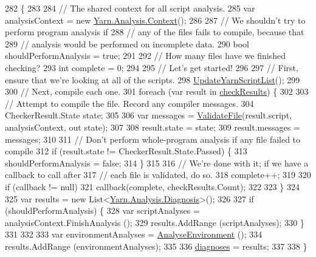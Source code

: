 \begin{DoxyCode}
282         \{
283 
284             \textcolor{comment}{// The shared context for all script analysis.}
285             var analysisContext = \textcolor{keyword}{new} \hyperlink{a00054}{Yarn.Analysis.Context}();
286 
287             \textcolor{comment}{// We shouldn't try to perform program analysis if}
288             \textcolor{comment}{// any of the files fails to compile, because that}
289             \textcolor{comment}{// analysis would be performed on incomplete data.}
290             \textcolor{keywordtype}{bool} shouldPerformAnalysis = \textcolor{keyword}{true};
291 
292             \textcolor{comment}{// How many files have we finished checking?}
293             \textcolor{keywordtype}{int} complete = 0;
294 
295             \textcolor{comment}{// Let's get started!}
296 
297             \textcolor{comment}{// First, ensure that we're looking at all of the scripts.}
298             \hyperlink{a00164_a406febf62d77eaabc235f6316e537345}{UpdateYarnScriptList}();
299 
300             \textcolor{comment}{// Next, compile each one.}
301             \textcolor{keywordflow}{foreach} (var result \textcolor{keywordflow}{in} \hyperlink{a00164_aa85ab7bd194e5425b991b9c216d4d10e}{checkResults}) \{
302 
303                 \textcolor{comment}{// Attempt to compile the file. Record any compiler messages.}
304                 CheckerResult.State state;
305 
306                 var messages = \hyperlink{a00164_a6f2bf42b228ea29c6477e369226db8b6}{ValidateFile}(result.script, analysisContext, out state);
307 
308                 result.state = state;
309                 result.messages = messages;
310 
311                 \textcolor{comment}{// Don't perform whole-program analysis if any file failed to compile}
312                 \textcolor{keywordflow}{if} (result.state != CheckerResult.State.Passed) \{
313                     shouldPerformAnalysis = \textcolor{keyword}{false};
314                 \}
315 
316                 \textcolor{comment}{// We're done with it; if we have a callback to call after}
317                 \textcolor{comment}{// each file is validated, do so.}
318                 complete++;
319 
320                 \textcolor{keywordflow}{if} (callback != null)
321                     callback(complete, checkResults.Count);
322 
323             \}
324 
325             var results = \textcolor{keyword}{new} List<\hyperlink{a00087}{Yarn.Analysis.Diagnosis}>();
326 
327             \textcolor{keywordflow}{if} (shouldPerformAnalysis) \{
328                 var scriptAnalyses = analysisContext.FinishAnalysis ();
329                 results.AddRange (scriptAnalyses);
330             \}
331 
332 
333             var environmentAnalyses = \hyperlink{a00164_a9c207786c349120dc439bdce53072191}{AnalyseEnvironment} ();
334             results.AddRange (environmentAnalyses);
335 
336             \hyperlink{a00164_a25c92cbfdd09661a96714d05b14af886}{diagnoses} = results;
337 
338         \}
\end{DoxyCode}
